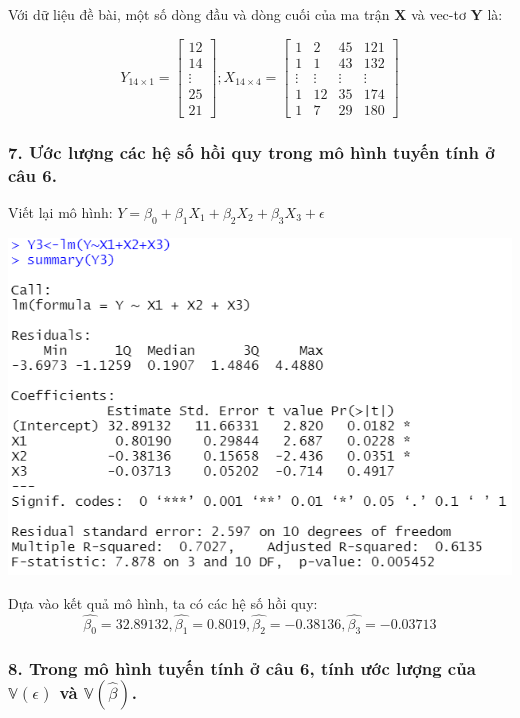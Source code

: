 \documentclass[a4paper]{article}
\theoremstyle{nonumberplain}
\begin{document}
Với dữ liệu đề bài, một số dòng đầu và dòng cuối của ma trận $\mathbf{X}$ và vec-tơ $\mathbf{Y}$ là:

\[{Y_{14 \times 1}} = \left[ {\begin{array}{*{20}{c}}
  {{12}} \\
  {{14}}  \\
   \vdots  \\ 
  {{25}} \\
  {{21}}
\end{array}} \right];{X_{14 \times 4}} = \left[ {\begin{array}{*{20}{c}}
  1&{{2}}&{{45}}&{{121}} \\ 
  1&{{1}}&{{43}}&{{132}} \\ 
  \vdots & \vdots & \vdots & \vdots  \\ 
  1&{{12}}&{{35}}&{{174}} \\ 
  1&{{7}}&{{29}}&{{180}} 
\end{array}} \right]\]

\subsubsection*{7. Ước lượng các hệ số hồi quy trong mô hình tuyến tính ở câu 6.}
Viết lại mô hình: $Y = \beta_0 + \beta_1 X_1 + \beta_2 X_2 + \beta_3 X_3 + \epsilon$

\begin{center}
\includegraphics{bai3_6.PNG} 
\end{center}
Dựa vào kết quả mô hình, ta có các hệ số hồi quy:
$$\hat{\beta_0} = 32.89132, \hat{\beta_1} = 0.8019, \hat{\beta_2} = -0.38136, \hat{\beta_3} = -0.03713$$
\subsubsection*{8. Trong mô hình tuyến tính ở câu 6, tính ước lượng của $\mathbb{V}(\epsilon)$ và $\mathbb{V}(\hat{\beta})$.}
\end{document}
